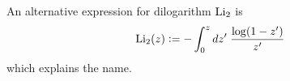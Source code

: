 %
%
%
%

\pagestyle{headandfoot}
\runningfootrule
{}
\runningheader{}{}{}
\firstpagefooter{}{}{}


\def\Li{\mbox{\rm Li}_{2}}
\def\dilog{\mbox{\tt dilog}}

An alternative expression for dilogarithm $\Li$ is
%
\begin{equation}
\Li(z) \bydef
- \int_{0}^{z} dz' \; \frac{\log(1-z')}{z'} \label{eq:li-double}
\end{equation}
%
which explains the name.

